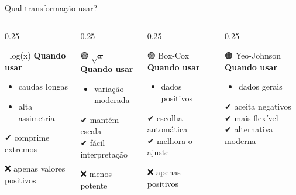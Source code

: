\documentclass[
  ignorenonframetext,
  aspectratio=169,
]{beamer}
\providecommand{\tightlist}{%
  \setlength{\itemsep}{0pt}\setlength{\parskip}{0pt}}
\begin{document}
\begin{frame}{Qual transformação usar?}
\label{qual-transformauxe7uxe3o-usar}
\begin{columns}[T]
\begin{column}{0.25\linewidth}
\begin{block}{🔵 log(x)}
\label{logx}
\textbf{Quando usar}

\begin{itemize}
\tightlist
\item
  caudas longas\\
\item
  alta assimetria
\end{itemize}

✔ comprime extremos

❌ apenas valores positivos
\end{block}
\end{column}

\begin{column}{0.25\linewidth}
\begin{block}{🟢 \(\sqrt{x}\)}
\label{sqrtx}
\textbf{Quando usar}

\begin{itemize}
\tightlist
\item
  variação moderada
\end{itemize}

✔ mantém escala\\
✔ fácil interpretação

❌ menos potente
\end{block}
\end{column}

\begin{column}{0.25\linewidth}
\begin{block}{🟣 Box-Cox}
\label{box-cox-1}
\textbf{Quando usar}

\begin{itemize}
\tightlist
\item
  dados positivos
\end{itemize}

✔ escolha automática\\
✔ melhora o ajuste

❌ apenas positivos
\end{block}
\end{column}

\begin{column}{0.25\linewidth}
\begin{block}{🟠 Yeo-Johnson}
\label{yeo-johnson-1}
\textbf{Quando usar}

\begin{itemize}
\tightlist
\item
  dados gerais
\end{itemize}

✔ aceita negativos\\
✔ mais flexível\\
✔ alternativa moderna
\end{block}
\end{column}
\end{columns}
\end{frame}
\end{document}
